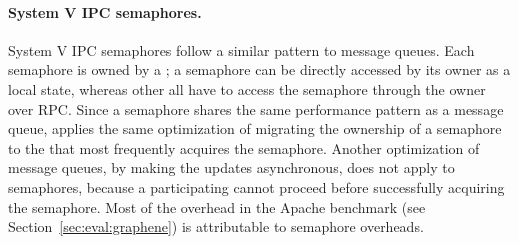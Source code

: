
\paragraph{System V IPC semaphores.} System V IPC semaphores 
follow a similar pattern to message queues.
Each semaphore is owned by a \picoproc{};
a semaphore can be directly accessed by its owner as a local state,
whereas other \picoprocs{} all have to access the semaphore through the owner over RPC.
Since a semaphore shares the same performance pattern as a message queue,
\thelibos{} applies the same optimization
of migrating the ownership of a semaphore
to the \picoproc{} that most frequently acquires the semaphore.
Another optimization of message queues, by making the updates asynchronous,
does not apply to semaphores,
because a participating \picoproc{} cannot proceed before successfully acquiring the semaphore. 
Most of the overhead in the Apache benchmark (see Section~\ref{sec:eval:graphene}) is attributable to semaphore overheads.


